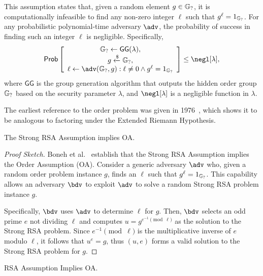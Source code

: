 \documentclass{iacrcc}
\begin{document}
\begin{definition}
This assumption states that, given a random element $g \in \mathbb{G}_{?}$, it is computationally infeasible to find any non-zero integer $\ell$ such that $g^\ell = 1_{\mathbb{G}_{?}}$. For any probabilistic polynomial-time adversary $\adv$, the probability of success in finding such an integer $\ell$ is negligible. Specifically,
\[
\Pr
\left[
\begin{array}{c}
\hidgrp \leftarrow \mathsf{GG}(\lambda),                                  \\
g \xleftarrow{\$} \hidgrp,                                                \\
\ell \leftarrow \adv(\hidgrp, g) : \ell \ne 0 \wedge g^\ell = 1_{\hidgrp}
\end{array}
\right] \leq \negl[\lambda],
\]
where $\mathsf{GG}$ is the group generation algorithm that outputs the hidden order group $\mathbb{G}_{?}$ based on the security parameter $\lambda$, and $\negl[\lambda]$ is a negligible function in $\lambda$.
\end{definition}

The earliest reference to the order problem was given in 1976~\cite{Miller1976}, which shows it to be analogous to factoring under the Extended Riemann Hypothesis.

\begin{claim}
The Strong RSA Assumption implies OA.
\end{claim}

\begin{proof}[Proof Sketch]
Boneh et al.~\cite{C:BonBunFis19} establish that the Strong RSA Assumption implies the Order Assumption (OA). Consider a generic adversary \(\adv\) who, given a random order problem instance \(g\), finds an \(\ell\) such that \(g^\ell = 1_{\mathbb{G}_{?}}\). This capability allows an adversary \(\bdv\) to exploit \(\adv\) to solve a random Strong RSA problem instance \(g\).

Specifically, \(\bdv\) uses \(\adv\) to determine \(\ell\) for \(g\). Then, \(\bdv\) selects an odd prime \(e\) not dividing \(\ell\) and computes \(u = g^{e^{-1} \pmod{\ell}}\) as the solution to the Strong RSA problem. Since \(e^{-1} \pmod{\ell}\) is the multiplicative inverse of \(e\) modulo \(\ell\), it follows that \(u^e = g\), thus \((u, e)\) forms a valid solution to the Strong RSA problem for \(g\).
\end{proof}

\begin{claim}
RSA Assumption Implies OA.
\end{claim}
\end{document}

